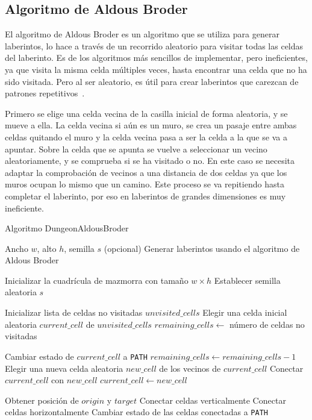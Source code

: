 \clearpage 

\subsection{Algoritmo de Aldous Broder}
El algoritmo de Aldous Broder es un algoritmo que se utiliza para generar laberintos, lo hace a través de un recorrido aleatorio para visitar todas las celdas del laberinto. Es de los algoritmos más sencillos de implementar, pero ineficientes, ya que visita la misma celda múltiples veces, hasta encontrar una celda que no ha sido visitada. Pero al ser aleatorio, es útil para crear laberintos que carezcan de patrones repetitivos~\cite{MazeGenAnalysis}.

Primero se elige una celda vecina de la casilla inicial de forma aleatoria, y se mueve a ella. La celda vecina si aún es un muro, se crea un pasaje entre ambas celdas quitando el muro y la celda vecina pasa a ser la celda a la que se va a apuntar. Sobre la celda que se apunta se vuelve a seleccionar un vecino aleatoriamente, y se comprueba si se ha visitado o no. En este caso se necesita adaptar la comprobación de vecinos a una distancia de dos celdas ya que los muros ocupan lo mismo que un camino. Este proceso se va repitiendo hasta completar el laberinto, por eso en laberintos de grandes dimensiones es muy ineficiente.



\begin{algorithm}
\caption{Algoritmo DungeonAldousBroder}
\begin{algorithmic}[1]
\Require Ancho $w$, alto $h$, semilla $s$ (opcional)
\Ensure Generar laberintos usando el algoritmo de Aldous Broder

\State Inicializar la cuadrícula de mazmorra con tamaño $w \times h$
    \State Establecer semilla aleatoria $s$
\EndIf

\State Inicializar lista de celdas no visitadas $unvisited\_cells$
\State Elegir una celda inicial aleatoria $current\_cell$ de $unvisited\_cells$
\State $remaining\_cells \gets$ número de celdas no visitadas

        \State Cambiar estado de $current\_cell$ a \texttt{PATH}
        \State $remaining\_cells \gets remaining\_cells - 1$
    \EndIf
    \State Elegir una nueva celda aleatoria $new\_cell$ de los vecinos de $current\_cell$
        \State Conectar $current\_cell$ con $new\_cell$
    \EndIf
    \State $current\_cell \gets new\_cell$
\EndWhile

    \State Obtener posición de $origin$ y $target$
        \State Conectar celdas verticalmente
    \Else
        \State Conectar celdas horizontalmente
    \EndIf
    \State Cambiar estado de las celdas conectadas a \texttt{PATH}
\EndProcedure

\end{algorithmic}
\end{algorithm}




